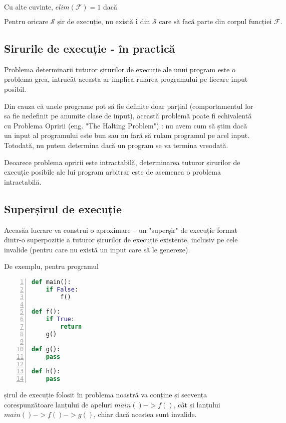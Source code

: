 Cu alte cuvinte, $elim(\mathcal{F}) = 1$ dacă

\[
	\text{Pentru oricare } \mathcal{S} \text{ șir de execuție, nu
		există } \mathbf{i} \text{ din } \mathcal{S} \text { care să facă
		parte din corpul funcției } \mathcal{F}.
\]

\subsection{Sirurile de execuție - în practică}

Problema determinarii tuturor șirurilor de execuție ale unui
program este o problema grea, intrucât aceasta ar implica rularea
programului pe fiecare input posibil.

Din cauza că unele programe pot să fie definite doar parțial
(comportamentul lor sa fie nedefinit pe anumite clase de input),
această problemă poate fi echivalentă cu Problema Opririi (eng. "The
Halting Problem") \cite{the_halting_problem}: nu avem cum să știm
dacă un input al programului este bun sau nu fară să rulam
programul pe acel input. Totodată, nu putem determina dacă un program se va termina
vreodată.

Deoarece problema opririi este intractabilă, determinarea tuturor
șirurilor de execuție posibile ale lui program arbitrar este de
asemenea o problema intractabilă.

\subsection{Superșirul de execuție}\label{supersirul_de_executie}

Aceasăa lucrare va construi o aproximare -- un "superșir" de execuție format
dintr-o superpoziție a tuturor șirurilor de execuție existente, inclusiv pe cele
invalide (pentru care nu există un input care să le genereze).

De exemplu, pentru programul
\begin{lstlisting}[language=Python, numbers=left]
def main():
    if False:
        f()

def f():
    if True:
        return
    g()

def g():
    pass

def h():
    pass
\end{lstlisting}

șirul de execuție folosit în problema noastră va conține și
secvența corespunzătoare lanțului de apeluri \(main() -> f()\),
cât și lanțului \(main() -> f() -> g()\),
chiar dacă acestea sunt invalide.

